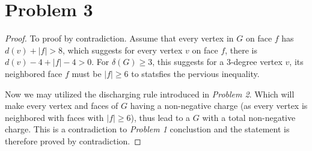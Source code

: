 \documentclass[11pt]{article}
\begin{document}
\section*{Problem 3}

\begin{proof}
    To proof by contradiction. Assume that every vertex in $G$ on face $f$ has $d(v) + |f| > 8$, which suggests for every vertex $v$ on face $f$, there is $d(v) - 4 + |f| - 4 > 0$. For $\delta(G) \geq 3$, this suggests for a 3-degree vertex $v$, its neighbored face $f$ must be $|f| \geq 6$ to statsfies the pervious inequality.

    Now we may utilized the discharging rule introduced in \textit{Problem 2}. Which will make every vertex and faces of $G$ having a non-negative charge (as every vertex is neighbored with faces with $|f| \geq 6$), thus lead to a $G$ with a total non-negative charge. This is a contradiction to \textit{Problem 1} conclustion and the statement is therefore proved by contradiction.
\end{proof}

%
% 
% 
\end{document}
